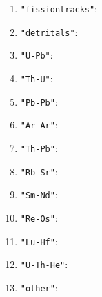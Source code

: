 \begin{refsection}
\begin{enumerate}[leftmargin=\parindent,align=left,
      labelwidth=\parindent,label*=3.\arabic*.]
\item{\tt "fissiontracks"}:
\item{\tt "detritals"}:
\item{\tt "U-Pb"}:
\item{\tt "Th-U"}:
\item{\tt "Pb-Pb"}:
\item{\tt "Ar-Ar"}:
\item{\tt "Th-Pb"}:
\item{\tt "Rb-Sr"}:
\item{\tt "Sm-Nd"}:
\item{\tt "Re-Os"}:
\item{\tt "Lu-Hf"}:
\item{\tt "U-Th-He"}:
\item{\tt "other"}:
\end{enumerate}

\printbibliography[heading=subbibliography]

\end{refsection}
